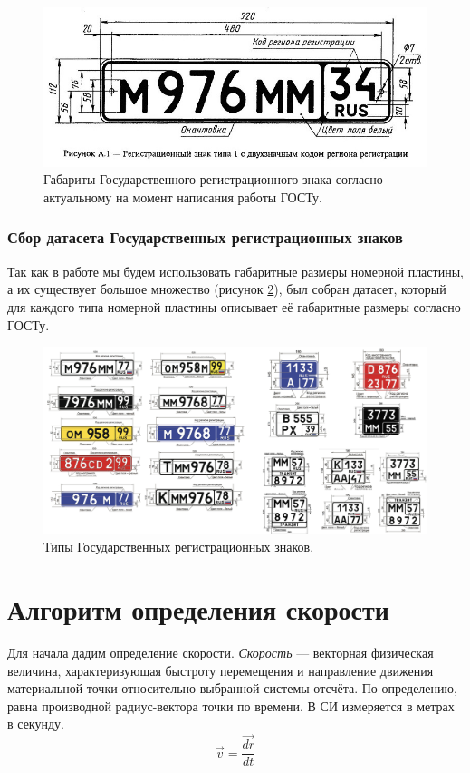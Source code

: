 \documentclass[specification,annotation,times]{itmo-student-thesis}
\begin{document}
	
	\begin{figure}[!ht]
		\caption{Габариты Государственного регистрационного знака согласно актуальному на момент написания работы ГОСТу.}\label{img:licnum-gost}
		\includegraphics[width=0.85\linewidth]{../png/licnum1.jpeg}
		\centering
	\end{figure}
	
	\subsubsection{Сбор датасета Государственных регистрационных знаков}
	Так как в работе мы будем использовать габаритные размеры номерной пластины, а их существует большое множество (рисунок \ref{img:plates}), был собран датасет, который для каждого типа номерной пластины описывает её габаритные размеры согласно ГОСТу.
	
	\begin{figure}[!ht]
		\caption{Типы Государственных регистрационных знаков.}\label{img:plates}
		\includegraphics[width=0.85\linewidth]{../png/plates.png}
		\centering
	\end{figure}
	
	\section{Алгоритм определения скорости}
	Для начала дадим определение скорости. \textit{Скорость} ---  векторная физическая величина, характеризующая быстроту перемещения и направление движения материальной точки относительно выбранной системы отсчёта. По определению, равна производной радиус-вектора точки по времени. В СИ измеряется в метрах в секунду.
	\begin{equation}
	\mathit{\vec{v}=\frac{\vec{dr}} {dt}}
	\label{eq:v}
	\end{equation}
	
\end{document}

